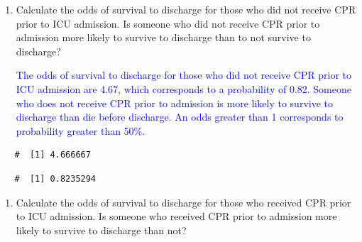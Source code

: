 \documentclass[letterpaper,12pt,twoside,]{pinp}
\begin{document}
\begin{enumerate}
  \begin{enumerate}
  \def\labelenumii{\alph{enumii})}
  \item
    Calculate the odds of survival to discharge for those who did not
    receive CPR prior to ICU admission. Is someone who did not receive
    CPR prior to admission more likely to survive to discharge than to
    not survive to discharge?

    \textcolor{blue}{The odds of survival to discharge for those who did not receive CPR prior to ICU admission are 4.67, which corresponds to a probability of 0.82. Someone who does not receive CPR prior to admission is more likely to survive to discharge than die before discharge. An odds greater than 1 corresponds to probability greater than 50\%.}
  \end{enumerate}

\begin{Shaded}
\begin{Highlighting}[]
\StringTok{ }\OperatorTok{/}
\end{Highlighting}
\end{Shaded}

  \begin{ShadedResult}
   \begin{verbatim}
   #  [1] 4.666667
   \end{verbatim}
   \end{ShadedResult}

\begin{Shaded}
\begin{Highlighting}[]
\StringTok{ }\OperatorTok{/}\NormalTok{(} \OperatorTok{+}\StringTok{ }
\end{Highlighting}
\end{Shaded}

  \begin{ShadedResult}
   \begin{verbatim}
   #  [1] 0.8235294
   \end{verbatim}
   \end{ShadedResult}

  \begin{enumerate}
  \def\labelenumii{\alph{enumii})}
  \setcounter{enumii}{1}
  \item
    Calculate the odds of survival to discharge for those who received
    CPR prior to ICU admission. Is someone who received CPR prior to
    admission more likely to survive to discharge than not?


\end{enumerate}
\end{enumerate}
\end{document}
